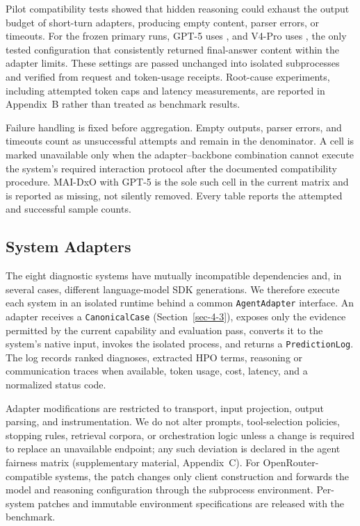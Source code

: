 \documentclass[letterpaper]{article} %
\begin{document}
Pilot compatibility tests showed that hidden reasoning could exhaust the output budget of short-turn adapters, producing empty content, parser errors, or timeouts. For the frozen primary runs, GPT-5 uses , and V4-Pro uses , the only tested configuration that consistently returned final-answer content within the adapter limits. These settings are passed unchanged into isolated subprocesses and verified from request and token-usage receipts. Root-cause experiments, including attempted token caps and latency measurements, are reported in Appendix~B rather than treated as benchmark results.

Failure handling is fixed before aggregation. Empty outputs, parser errors, and timeouts count as unsuccessful attempts and remain in the denominator. A cell is marked unavailable only when the adapter--backbone combination cannot execute the system's required interaction protocol after the documented compatibility procedure. MAI-DxO with GPT-5 is the sole such cell in the current matrix and is reported as missing, not silently removed. Every table reports the attempted and successful sample counts.

\subsection{System Adapters}
\label{sec-5-3}

The eight diagnostic systems have mutually incompatible dependencies and, in several cases, different language-model SDK generations. We therefore execute each system in an isolated runtime behind a common \texttt{AgentAdapter} interface. An adapter receives a \texttt{CanonicalCase} (Section~\ref{sec-4-3}), exposes only the evidence permitted by the current capability and evaluation pass, converts it to the system's native input, invokes the isolated process, and returns a \texttt{PredictionLog}. The log records ranked diagnoses, extracted HPO terms, reasoning or communication traces when available, token usage, cost, latency, and a normalized status code.

Adapter modifications are restricted to transport, input projection, output parsing, and instrumentation. We do not alter prompts, tool-selection policies, stopping rules, retrieval corpora, or orchestration logic unless a change is required to replace an unavailable endpoint; any such deviation is declared in the agent fairness matrix (supplementary material, Appendix~C). For OpenRouter-compatible systems, the patch changes only client construction and forwards the model and reasoning configuration through the subprocess environment. Per-system patches and immutable environment specifications are released with the benchmark.
\end{document}
